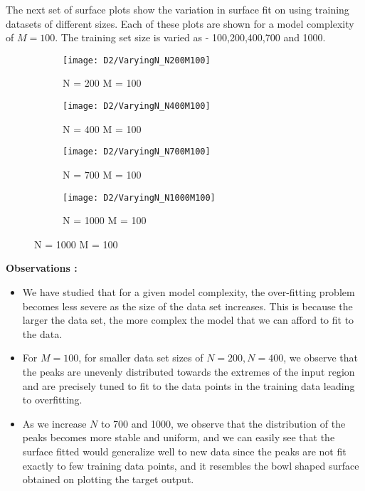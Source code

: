 \documentclass{article}
\begin{document}
\begin{flushleft}
The next set of surface plots show the variation in surface fit on using training datasets of different sizes. Each of these plots are shown for a model complexity of $M = 100$. The training set size is varied as - 100,200,400,700 and 1000. 

\end{flushleft}
\begin{figure}[H]

\begin{subfigure}{.5\textwidth}
\centering
\texttt{[image: D2/VaryingN\_N200M100]}
\caption{N = 200 M = 100}
\end{subfigure}
\begin{subfigure}{.5\textwidth}
\texttt{[image: D2/VaryingN\_N400M100]}
\caption{N = 400 M = 100}
\end{subfigure}


\begin{subfigure}{.5\textwidth}
\centering
\texttt{[image: D2/VaryingN\_N700M100]}
\caption{N = 700 M = 100}
\end{subfigure}
\begin{subfigure}{.5\textwidth}
\texttt{[image: D2/VaryingN\_N1000M100]}
\caption{N = 1000 M = 100}
\end{subfigure}



\end{figure}


\textbf{Observations :}

\begin{itemize}
\item We have studied that for a given model complexity, the over-fitting problem becomes less severe as the size of the data set increases. This is because the larger the data set, the more complex the model that we can afford to fit to the data.
\item For $M=100$, for smaller data set sizes of $N=200, N=400$, we observe that the peaks are unevenly distributed towards the extremes of the input region and are precisely tuned to fit to the data points in the training data leading to overfitting.
\item As we increase $N$ to 700 and 1000, we observe that the distribution of the peaks becomes more stable and uniform, and we can easily see that the surface fitted would generalize well to new data since the peaks are not fit exactly to few training data points, and it resembles the bowl shaped surface obtained on plotting the target output.
\end{itemize}
\end{document}
